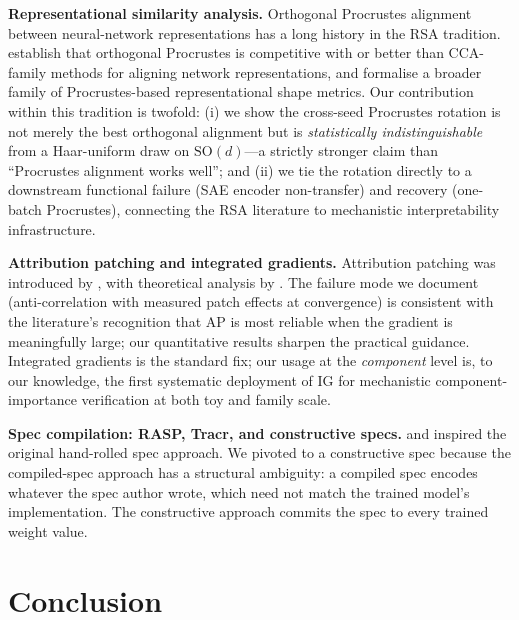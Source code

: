 \documentclass[11pt,letterpaper]{article}
\begin{document}
\textbf{Representational similarity analysis.} Orthogonal Procrustes alignment between neural-network representations has a long history in the RSA tradition. \citet{kornblith2019similarity} establish that orthogonal Procrustes is competitive with or better than CCA-family methods for aligning network representations, and \citet{williams2021generalized} formalise a broader family of Procrustes-based representational shape metrics. Our contribution within this tradition is twofold: (i) we show the cross-seed Procrustes rotation is not merely the best orthogonal alignment but is \emph{statistically indistinguishable} from a Haar-uniform draw on $\mathrm{SO}(d)$---a strictly stronger claim than ``Procrustes alignment works well''; and (ii) we tie the rotation directly to a downstream functional failure (SAE encoder non-transfer) and recovery (one-batch Procrustes), connecting the RSA literature to mechanistic interpretability infrastructure.

\textbf{Attribution patching and integrated gradients.} Attribution patching was introduced by \citet{nanda2023attribution}, with theoretical analysis by \citet{kramar2024atp}. The failure mode we document (anti-correlation with measured patch effects at convergence) is consistent with the literature's recognition that AP is most reliable when the gradient is meaningfully large; our quantitative results sharpen the practical guidance. Integrated gradients \citep{sundararajan2017axiomatic} is the standard fix; our usage at the \emph{component} level is, to our knowledge, the first systematic deployment of IG for mechanistic component-importance verification at both toy and family scale.

\textbf{Spec compilation: RASP, Tracr, and constructive specs.} \citet{weiss2021rasp} and \citet{lindner2023tracr} inspired the original hand-rolled spec approach. We pivoted to a constructive spec because the compiled-spec approach has a structural ambiguity: a compiled spec encodes whatever the spec author wrote, which need not match the trained model's implementation. The constructive approach commits the spec to every trained weight value.

\section{Conclusion}
\end{document}
